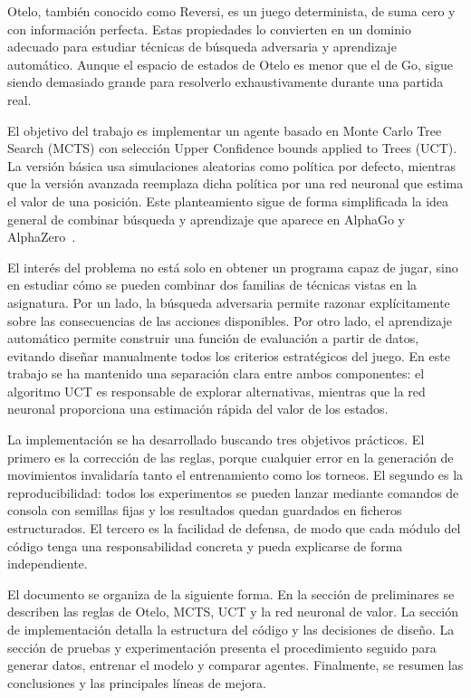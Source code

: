 \documentclass[conference,a4paper]{IEEEtran}
\begin{document}
Otelo, también conocido como Reversi, es un juego determinista, de suma cero y
con información perfecta. Estas propiedades lo convierten en un dominio adecuado
para estudiar técnicas de búsqueda adversaria y aprendizaje automático. Aunque
el espacio de estados de Otelo es menor que el de Go, sigue siendo demasiado
grande para resolverlo exhaustivamente durante una partida real.

El objetivo del trabajo es implementar un agente basado en Monte Carlo Tree
Search (MCTS) con selección Upper Confidence bounds applied to Trees (UCT). La
versión básica usa simulaciones aleatorias como política por defecto, mientras
que la versión avanzada reemplaza dicha política por una red neuronal que estima
el valor de una posición. Este planteamiento sigue de forma simplificada la idea
general de combinar búsqueda y aprendizaje que aparece en AlphaGo y
AlphaZero~\cite{silver2016, silver2017}.

El interés del problema no está solo en obtener un programa capaz de jugar, sino
en estudiar cómo se pueden combinar dos familias de técnicas vistas en la
asignatura. Por un lado, la búsqueda adversaria permite razonar explícitamente
sobre las consecuencias de las acciones disponibles. Por otro lado, el
aprendizaje automático permite construir una función de evaluación a partir de
datos, evitando diseñar manualmente todos los criterios estratégicos del juego.
En este trabajo se ha mantenido una separación clara entre ambos componentes:
el algoritmo UCT es responsable de explorar alternativas, mientras que la red
neuronal proporciona una estimación rápida del valor de los estados.

La implementación se ha desarrollado buscando tres objetivos prácticos. El
primero es la corrección de las reglas, porque cualquier error en la generación
de movimientos invalidaría tanto el entrenamiento como los torneos. El segundo
es la reproducibilidad: todos los experimentos se pueden lanzar mediante
comandos de consola con semillas fijas y los resultados quedan guardados en
ficheros estructurados. El tercero es la facilidad de defensa, de modo que cada
módulo del código tenga una responsabilidad concreta y pueda explicarse de forma
independiente.

El documento se organiza de la siguiente forma. En la sección de preliminares se
describen las reglas de Otelo, MCTS, UCT y la red neuronal de valor. La sección
de implementación detalla la estructura del código y las decisiones de diseño.
La sección de pruebas y experimentación presenta el procedimiento seguido para
generar datos, entrenar el modelo y comparar agentes. Finalmente, se resumen las
conclusiones y las principales líneas de mejora.
\end{document}
